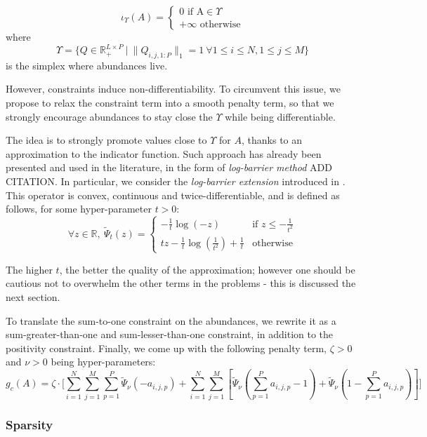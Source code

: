 \documentclass{article}
\begin{document}
$$\iota_\Upsilon (A) = \begin{cases} 0 \text{ if A}\in \Upsilon\\ +\infty \text{ otherwise} \end{cases}$$
where
$$\Upsilon = \{Q \in \mathbb{R}^{L \times P}_+\ |\ \| Q_{i, j, 1:P} \|_1 = 1 \ \forall 1 \leq i \leq N, 1 \leq j \leq M\}$$
is the simplex where abundances live.

However, constraints induce non-differentiability. To circumvent this issue, we propose to relax the constraint term into a smooth penalty term, so that we strongly encourage abundances to stay close the $\Upsilon$ while being differentiable.

The idea is to strongly promote values close to $\Upsilon$ for $A$, thanks to an approximation to the indicator function. Such approach has already been presented and used in the literature, in the form of \emph{log-barrier method} ADD CITATION. In particular, we consider the \emph{log-barrier extension} introduced in \citet{kervadec_constrained_2020}. This operator is convex, continuous and twice-differentiable, and is defined as follows, for some hyper-parameter $t > 0$:
$$\forall z\in \mathbb{R},\ \tilde\Psi_t (z) = \begin{cases} - \frac{1}{t} \log (-z) & \text{if } z \leq -\frac{1}{t^2}\\ tz - \frac{1}{t} \log(\frac{1}{t^2}) + \frac{1}{t} & \text{otherwise} \end{cases}$$

The higher $t$, the better the quality of the approximation; however one should be cautious not to overwhelm the other terms in the problems - this is discussed the next section.

To translate the sum-to-one constraint on the abundances, we rewrite it as a sum-greater-than-one and sum-lesser-than-one constraint, in addition to the positivity constraint. Finally, we come up with the following penalty term, $\zeta > 0$ and $\nu > 0$ being hyper-parameters:
\begin{equation}\label{eq:g_c}
  g_c (A) = \zeta \cdot \Bigg[ \sum_{i = 1}^N \sum_{j = 1}^M \sum_{p=1}^P \tilde\Psi_\nu (-a_{i,j,p}) + \sum_{i = 1}^N \sum_{j = 1}^M \left[ \tilde\Psi_\nu(\sum_{p=1}^P a_{i,j,p} - 1) + \tilde\Psi_\nu(1 - \sum_{p=1}^Pa_{i,j,p}) \right] \Bigg]
\end{equation}

\subsubsection{Sparsity}
\end{document}
